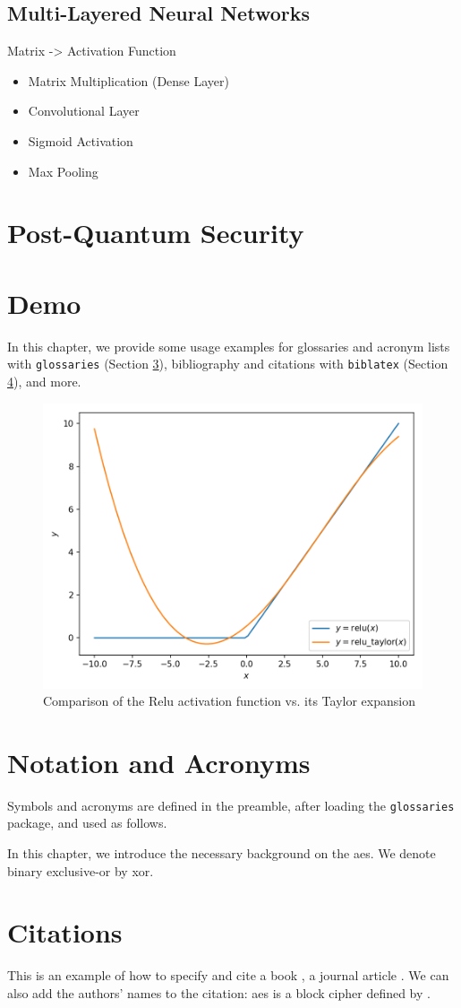 \subsection{Multi-Layered Neural Networks}
Matrix -> Activation Function
\begin{itemize}
  \item Matrix Multiplication (Dense Layer)
  \item Convolutional Layer
  \item Sigmoid Activation
  \item Max Pooling
\end{itemize}

\section{Post-Quantum Security}

\section{Demo}
In this chapter, we provide some usage examples for
glossaries and acronym lists with \texttt{glossaries} (Section \ref{sec:gloss}),
bibliography and citations with \texttt{biblatex} (Section \ref{sec:bib}), and more.

\begin{figure}[H]
  \centering
  \includegraphics[width=0.8\linewidth]{figures/taylor-relu.png}
  \caption{Comparison of the Relu activation function vs. its Taylor expansion}
\end{figure}

\section{Notation and Acronyms}
\label{sec:gloss}
Symbols and acronyms are defined in the preamble, after loading the \texttt{glossaries} package, and used as follows.

In this chapter, we introduce the necessary background on the \gls{aes}.
We denote binary exclusive-or by \gls{xor}.

\section{Citations}
\label{sec:bib}
This is an example of how to specify and cite
a book \cite{AESbook},
a journal article \cite{bstjShannon49}.
We can also add the authors' names to the citation:
\Gls{aes} is a block cipher defined by \textcite{AESbook}.
